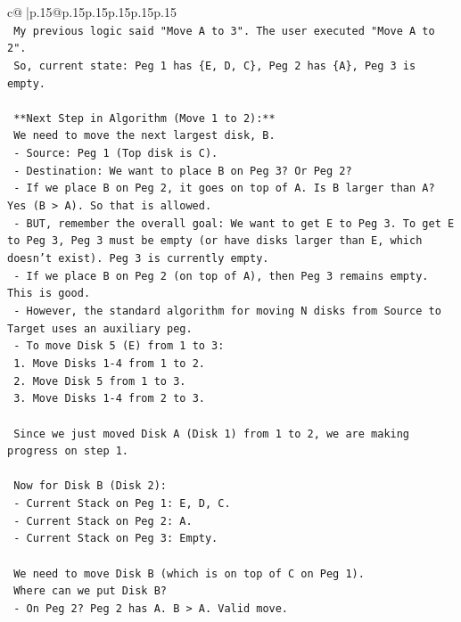 \documentclass{article}
\begin{document}
{\begin{supertabular}{c@{$\;$}|p{.15\linewidth}@{}p{.15\linewidth}p{.15\linewidth}p{.15\linewidth}p{.15\linewidth}p{.15\linewidth}}
{{{\\ 
\texttt{  My previous logic said "Move A to 3". The user executed "Move A to 2".} \\
\texttt{  So, current state: Peg 1 has \{E, D, C\}, Peg 2 has \{A\}, Peg 3 is empty.} \\
\\ 
\texttt{  **Next Step in Algorithm (Move 1 to 2):**} \\
\texttt{  We need to move the next largest disk, B.} \\
\texttt{  {-} Source: Peg 1 (Top disk is C).} \\
\texttt{  {-} Destination: We want to place B on Peg 3? Or Peg 2?} \\
\texttt{    {-} If we place B on Peg 2, it goes on top of A. Is B larger than A? Yes (B > A). So that is allowed.} \\
\texttt{    {-} BUT, remember the overall goal: We want to get E to Peg 3. To get E to Peg 3, Peg 3 must be empty (or have disks larger than E, which doesn't exist). Peg 3 is currently empty.} \\
\texttt{    {-} If we place B on Peg 2 (on top of A), then Peg 3 remains empty. This is good.} \\
\texttt{    {-} However, the standard algorithm for moving N disks from Source to Target uses an auxiliary peg.} \\
\texttt{      {-} To move Disk 5 (E) from 1 to 3:} \\
\texttt{        1. Move Disks 1{-}4 from 1 to 2.} \\
\texttt{        2. Move Disk 5 from 1 to 3.} \\
\texttt{        3. Move Disks 1{-}4 from 2 to 3.} \\
\\ 
\texttt{  Since we just moved Disk A (Disk 1) from 1 to 2, we are making progress on step 1.} \\
\\ 
\texttt{  Now for Disk B (Disk 2):} \\
\texttt{  {-} Current Stack on Peg 1: E, D, C.} \\
\texttt{  {-} Current Stack on Peg 2: A.} \\
\texttt{  {-} Current Stack on Peg 3: Empty.} \\
\\ 
\texttt{  We need to move Disk B (which is on top of C on Peg 1).} \\
\texttt{  Where can we put Disk B?} \\
\texttt{  {-} On Peg 2? Peg 2 has A. B > A. Valid move.} \\
}}}
\end{supertabular}}
\end{document}

